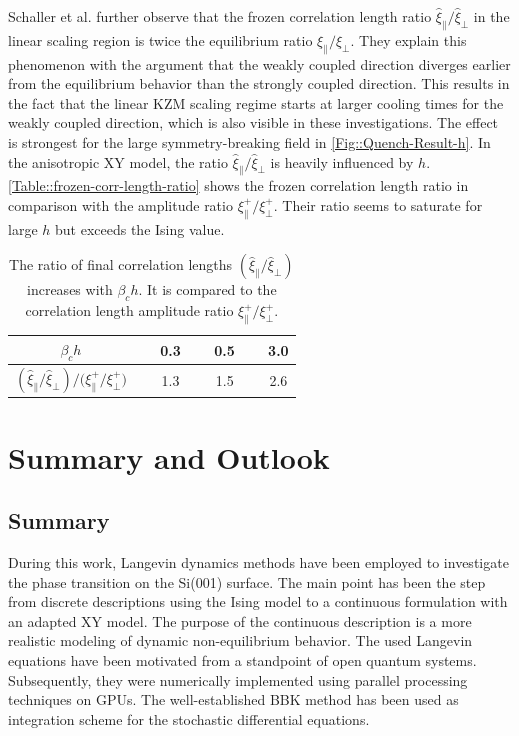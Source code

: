 	Schaller et al. further observe that the frozen correlation length ratio $\hat{\xi}_\parallel / \hat{\xi}_\perp$ in the linear scaling region is twice the equilibrium ratio $\xi_\parallel / \xi_\perp$. They explain this phenomenon with the argument that the weakly coupled direction diverges earlier from the equilibrium behavior than the strongly coupled direction. This results in the fact that the linear KZM scaling regime starts at larger cooling times for the weakly coupled direction, which is also visible in these investigations. The effect is strongest for the large symmetry-breaking field in \autoref{Fig::Quench-Result-h}. In the anisotropic XY model, the ratio $\hat{\xi}_\parallel / \hat{\xi}_\perp$ is heavily influenced by $h$. \autoref{Table::frozen-corr-length-ratio} shows the frozen correlation length ratio in comparison with the amplitude ratio ${{\xi}_\parallel^+} /	{{\xi}_\perp^+}$. Their ratio seems to saturate for large $h$ but exceeds the Ising value.
	\begin{table}[h!]
	\centering
	\caption{The ratio of final correlation lengths $\left({\hat{\xi}_\parallel}/{\hat{\xi}_\perp}\right)$ increases with $\beta_c h$. It is compared to the correlation length amplitude ratio ${{\xi}_\parallel^+} /	{{\xi}_\perp^+}$.}	
	\begin{tabular}{c c c c} 				
	$\beta_c h$  & $\quad$ 0.3 $\quad$ & 0.5 $\quad$ & 3.0\\
		\midrule
		$ \left({\hat{\xi}_\parallel}/{\hat{\xi}_\perp}\right) \Big / \Big({{\xi}_\parallel^+} /	{{\xi}_\perp^+}\Big) $ & 1.3 & 1.5 $\quad$ & 2.6 \\
		\end{tabular}
		\label{Table::frozen-corr-length-ratio}
	\end{table}
	
	\chapter{Summary and Outlook} \label{Chapter::Summary-Lookout}
	\section{Summary}
	During this work, Langevin dynamics methods have been employed to investigate the phase transition on the Si(001) surface. The main point has been the step from discrete descriptions using the Ising model to a continuous formulation with an adapted XY model. The purpose of the continuous description is a more realistic modeling of dynamic non-equilibrium behavior. The used Langevin equations have been motivated from a standpoint of open quantum systems. Subsequently, they were  numerically implemented using parallel processing techniques on GPUs. The well-established BBK method has been used as integration scheme for the stochastic differential equations. \\
	
